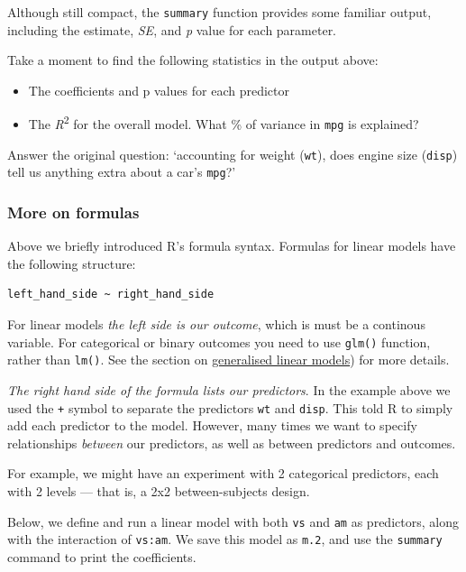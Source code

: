 \documentclass[]{article}
\providecommand{\tightlist}{%
  \setlength{\itemsep}{0pt}\setlength{\parskip}{0pt}}
\begin{document}
Although still compact, the \texttt{summary} function provides some familiar output,
including the estimate, \emph{SE}, and \emph{p} value for each parameter.

Take a moment to find the following statistics in the output above:

\begin{itemize}
\tightlist
\item
  The coefficients and p values for each predictor
\item
  The \emph{R}\textsuperscript{2} for the overall model. What \% of variance in \texttt{mpg} is explained?
\end{itemize}

Answer the original question: `accounting for weight (\texttt{wt}), does engine size
(\texttt{disp}) tell us anything extra about a car's \texttt{mpg}?'

\hypertarget{more-on-formulas}{%
\subsubsection*{More on formulas}\label{more-on-formulas}}

Above we briefly introduced R's formula syntax. Formulas for linear models have
the following structure:

\begin{verbatim}
left_hand_side ~ right_hand_side
\end{verbatim}

For linear models \emph{the left side is our outcome}, which is must be a continous
variable. For categorical or binary outcomes you need to use \texttt{glm()} function,
rather than \texttt{lm()}. See the section on \href{glm.html}{generalised linear models})
for more details.

\emph{The right hand side of the formula lists our predictors}. In the example above
we used the \texttt{+} symbol to separate the predictors \texttt{wt} and \texttt{disp}. This told R
to simply add each predictor to the model. However, many times we want to
specify relationships \emph{between} our predictors, as well as between predictors
and outcomes.

For example, we might have an experiment with 2 categorical predictors, each
with 2 levels --- that is, a 2x2 between-subjects design.

Below, we define and run a linear model with both \texttt{vs} and \texttt{am} as predictors,
along with the interaction of \texttt{vs:am}. We save this model as \texttt{m.2}, and use the
\texttt{summary} command to print the coefficients.
\end{document}

